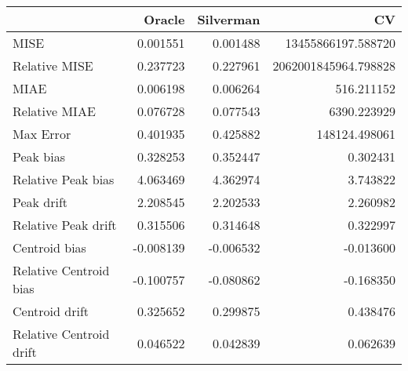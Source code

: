 \begin{tabular}{lrrr}
  \hline
 & Oracle & Silverman & CV \\ 
  \hline
MISE & 0.001551 & 0.001488 & 13455866197.588720 \\ 
  Relative MISE & 0.237723 & 0.227961 & 2062001845964.798828 \\ 
  MIAE & 0.006198 & 0.006264 & 516.211152 \\ 
  Relative MIAE & 0.076728 & 0.077543 & 6390.223929 \\ 
  Max Error & 0.401935 & 0.425882 & 148124.498061 \\ 
  Peak bias & 0.328253 & 0.352447 & 0.302431 \\ 
  Relative Peak bias & 4.063469 & 4.362974 & 3.743822 \\ 
  Peak drift & 2.208545 & 2.202533 & 2.260982 \\ 
  Relative Peak drift & 0.315506 & 0.314648 & 0.322997 \\ 
  Centroid bias & -0.008139 & -0.006532 & -0.013600 \\ 
  Relative Centroid bias & -0.100757 & -0.080862 & -0.168350 \\ 
  Centroid drift & 0.325652 & 0.299875 & 0.438476 \\ 
  Relative Centroid drift & 0.046522 & 0.042839 & 0.062639 \\ 
   \hline
\end{tabular}
